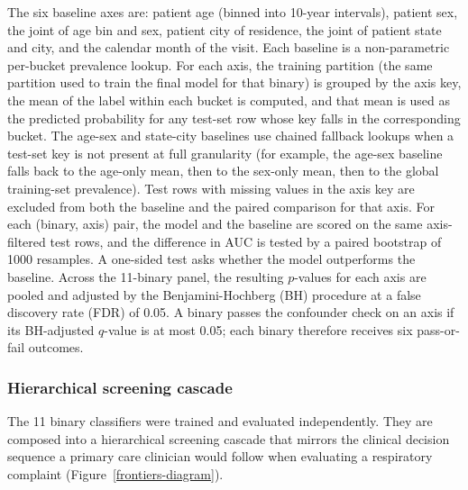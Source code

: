 \documentclass[utf8]{FrontiersinHarvard} %
\begin{document}
The six baseline axes are: patient age (binned into 10-year intervals), patient sex, the joint of age bin and sex, patient city of residence, the joint of patient state and city, and the calendar month of the visit. Each baseline is a non-parametric per-bucket prevalence lookup. For each axis, the training partition (the same partition used to train the final model for that binary) is grouped by the axis key, the mean of the label within each bucket is computed, and that mean is used as the predicted probability for any test-set row whose key falls in the corresponding bucket. The age-sex and state-city baselines use chained fallback lookups when a test-set key is not present at full granularity (for example, the age-sex baseline falls back to the age-only mean, then to the sex-only mean, then to the global training-set prevalence). Test rows with missing values in the axis key are excluded from both the baseline and the paired comparison for that axis. For each (binary, axis) pair, the model and the baseline are scored on the same axis-filtered test rows, and the difference in AUC is tested by a paired bootstrap of 1000 resamples. A one-sided test asks whether the model outperforms the baseline. Across the 11-binary panel, the resulting $p$-values for each axis are pooled and adjusted by the Benjamini-Hochberg (BH) procedure \citep{benjamini-hochberg-1995} at a false discovery rate (FDR) of 0.05. A binary passes the confounder check on an axis if its BH-adjusted $q$-value is at most 0.05; each binary therefore receives six pass-or-fail outcomes.

\subsubsection{Hierarchical screening cascade}
\label{sec:methods-cascade}

The 11 binary classifiers were trained and evaluated independently. They are composed into a hierarchical screening cascade that mirrors the clinical decision sequence a primary care clinician would follow when evaluating a respiratory complaint (Figure~\ref{frontiers-diagram}).
\end{document}
